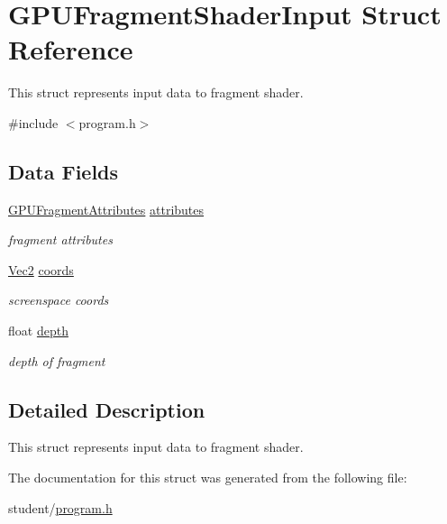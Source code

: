 \hypertarget{structGPUFragmentShaderInput}{}\section{G\+P\+U\+Fragment\+Shader\+Input Struct Reference}
\label{structGPUFragmentShaderInput}


This struct represents input data to fragment shader.  




{\ttfamily \#include $<$program.\+h$>$}

\subsection*{Data Fields}
\begin{DoxyCompactItemize}
\item 
\hyperlink{structGPUFragmentAttributes}{G\+P\+U\+Fragment\+Attributes} \hyperlink{structGPUFragmentShaderInput_ac222496adf3fb044cebcd79693b8962e}{attributes}\hypertarget{structGPUFragmentShaderInput_ac222496adf3fb044cebcd79693b8962e}{}\label{structGPUFragmentShaderInput_ac222496adf3fb044cebcd79693b8962e}

\begin{DoxyCompactList}\small\item\em fragment attributes \end{DoxyCompactList}\item 
\hyperlink{structVec2}{Vec2} \hyperlink{structGPUFragmentShaderInput_a6164fa8964152f4a4feb231926efa368}{coords}\hypertarget{structGPUFragmentShaderInput_a6164fa8964152f4a4feb231926efa368}{}\label{structGPUFragmentShaderInput_a6164fa8964152f4a4feb231926efa368}

\begin{DoxyCompactList}\small\item\em screenspace coords \end{DoxyCompactList}\item 
float \hyperlink{structGPUFragmentShaderInput_a634040ee49cce73c9f83ddd4478b36e3}{depth}\hypertarget{structGPUFragmentShaderInput_a634040ee49cce73c9f83ddd4478b36e3}{}\label{structGPUFragmentShaderInput_a634040ee49cce73c9f83ddd4478b36e3}

\begin{DoxyCompactList}\small\item\em depth of fragment \end{DoxyCompactList}\end{DoxyCompactItemize}


\subsection{Detailed Description}
This struct represents input data to fragment shader. 

The documentation for this struct was generated from the following file\+:\begin{DoxyCompactItemize}
\item 
student/\hyperlink{program_8h}{program.\+h}\end{DoxyCompactItemize}
